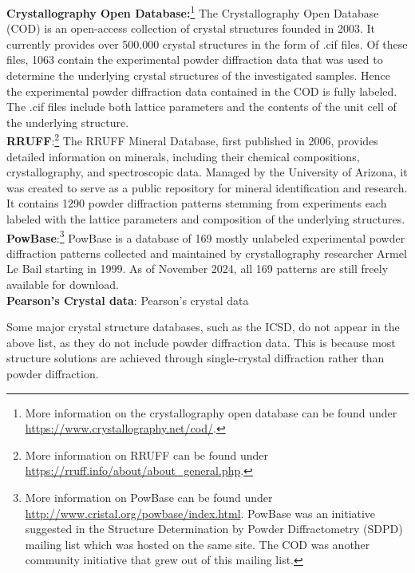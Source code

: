 \textbf{Crystallography Open Database:}\footnote{More information on the crystallography open database can be found under \url{https://www.crystallography.net/cod/}.} The Crystallography Open Database (COD) is an open-access collection of crystal structures founded in 2003. \cite{Graulis2009cod} It currently provides over 500.000 crystal structures in the form of .cif files. Of these files, 1063 contain the experimental powder diffraction data that was used to determine the underlying crystal structures of the investigated samples. Hence the experimental powder diffraction data contained in the COD is fully labeled. The .cif files include both lattice parameters and the contents of the unit cell of the underlying structure. \\

\textbf{RRUFF}:\footnote{More information on RRUFF can be found under \url{https://rruff.info/about/about_general.php}.} The RRUFF Mineral Database, first published in 2006, provides detailed information on minerals, including their chemical compositions, crystallography, and spectroscopic data. Managed by the University of Arizona, it was created to serve as a public repository for mineral identification and research. It contains \num{1290} powder diffraction patterns stemming from experiments each labeled with the lattice parameters and composition of the underlying structures. \\

\textbf{PowBase}:\footnote{More information on PowBase can be found under \url{http://www.cristal.org/powbase/index.html}. PowBase was an initiative suggested in the Structure Determination by
Powder Diffractometry (SDPD) mailing list which was hosted on the same site. The COD was another community initiative that grew out of this mailing list.} PowBase is a database of 169 mostly unlabeled experimental powder diffraction patterns collected and maintained by crystallography researcher Armel Le Bail starting in 1999. As of November 2024, all 169 patterns are still freely available for download. \\

\textbf{Pearson's Crystal data}: Pearson's crystal data 

Some major crystal structure databases, such as the ICSD, do not appear in the above list, as they do not include powder diffraction data. This is because most structure solutions are achieved through single-crystal diffraction rather than powder diffraction.
 
